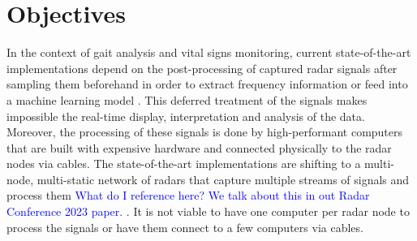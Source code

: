 \section{Objectives}

	In the context of gait analysis and vital signs monitoring, current state-of-the-art implementations \cite{Seifert2019,Biase2020,Zanardi2021,Antolinos2020, Amin2017, Iyer2022} depend on the post-processing of captured radar signals after sampling them beforehand in order to extract frequency information \cite{Antolinos2020, Seifert2019} or feed into a machine learning model \cite{Iyer2022}. This deferred treatment of the signals makes impossible the real-time display, interpretation and analysis of the data. Moreover, the processing of these signals is done by high-performant computers that are built with expensive hardware and connected physically to the radar nodes via cables. The state-of-the-art implementations are shifting to a multi-node, multi-static network of radars that capture multiple streams of signals and process them \textcolor{blue}{What do I reference here? We talk about this in out Radar Conference 2023 paper.} . It is not viable to have one computer per radar node to process the signals or have them connect to a few computers via cables.

